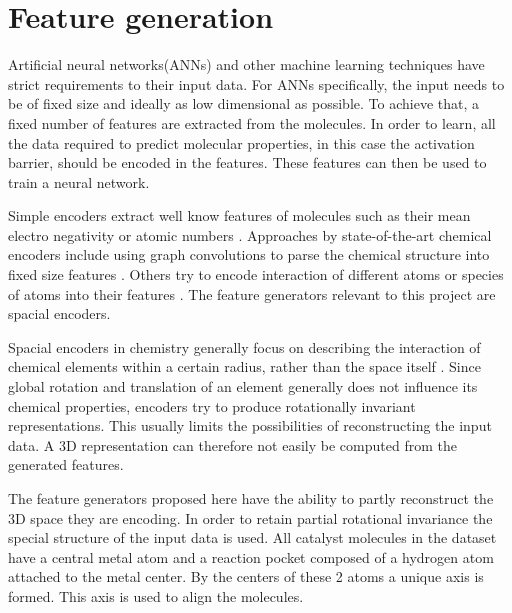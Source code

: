 
\chapter{Feature generation}
\label{ch:features}
Artificial neural networks(ANNs) and other machine learning techniques have strict requirements to their input data.
For ANNs specifically, the input needs to be of fixed size and ideally as low dimensional as possible.
To achieve that, a fixed number of features are extracted from the molecules.
In order to learn, all the data required to predict molecular properties, in this case the activation barrier, should be encoded in the features.
These features can then be used to train a neural network.

Simple encoders extract well know features of molecules such as their mean electro negativity or atomic numbers \cite{LO20181538}.
Approaches by state-of-the-art chemical encoders include using graph convolutions to parse the chemical structure into fixed size features \cite{GNN_ENCODER}.
Others try to encode interaction of different atoms or species of atoms into their features \cite{PhysRevLett.108.058301}.
The feature generators relevant to this project are spacial encoders.

Spacial encoders in chemistry generally focus on describing the interaction of chemical elements within a certain radius, rather 
than the space itself \cite{Bart_k_2013}.
Since global rotation and translation of an element generally does not influence its chemical properties,
encoders try to produce rotationally invariant representations.
This usually limits the possibilities of reconstructing the input data.
A 3D representation can therefore not easily be computed from the generated features.

The feature generators proposed here have the ability to partly reconstruct the 3D space they are encoding.
In order to retain partial rotational invariance the special structure of the input data is used.
All catalyst molecules in the dataset have a central metal atom and a reaction pocket composed of a hydrogen atom attached to the metal center.
By the centers of these 2 atoms a unique axis is formed.
This axis is used to align the molecules.

